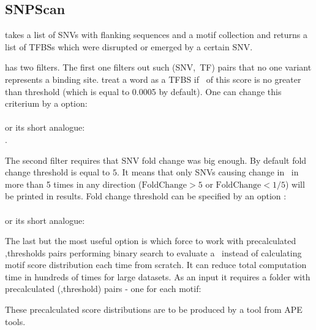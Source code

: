 \subsection{SNPScan}
 takes a list of SNVs with flanking sequences and a motif collection and returns a list of TFBSs which were disrupted or emerged by a certain SNV.
\usageheader
{}


 has two filters. The first one filters out such (SNV,~TF) pairs that no one variant represents a binding site.  treat a word as a TFBS if \pvalue\ of this score is no greater than threshold (which is equal to 0.0005 by default). One can change this criterium by a  option:\\
\\
or its short analogue:\\
.

The second filter requires that SNV fold change was big enough. By default fold change threshold is equal to $5$. It means that only SNVs causing change in \pvalue\ in more than 5 times in any direction ($\mbox{FoldChange}>5$ or $\mbox{FoldChange}<1/5$) will be printed in results. Fold change threshold can be specified by an option :\\
\\
or its short analogue:\\

The last but the most useful option is  which force  to work with precalculated \pvalue,thresholds pairs performing binary search to evaluate a \pvalue\ instead of calculating motif score distribution each time from scratch. It can reduce total computation time in hundreds of times for large datasets.
As an input it requires a folder with precalculated (\pvalue,threshold) pairs - one for each motif:\\

These precalculated score distributions are to be produced by a  tool from APE tools.


